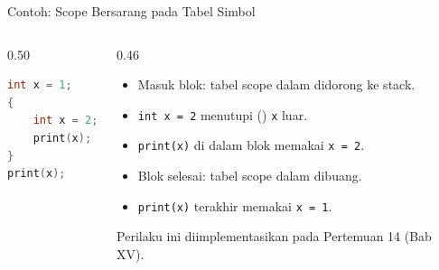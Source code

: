 \documentclass[aspectratio=169,10pt,t]{beamer}
\begin{document}
\begin{frame}[fragile]{Contoh: Scope Bersarang pada Tabel Simbol}
  \begin{columns}[T,onlytextwidth]
    \begin{column}{0.50\textwidth}
      \begin{lstlisting}[language=C,numbers=none,caption={Dua deklarasi \texttt{x} pada scope berbeda},label={lst:p1-shadow}]
int x = 1;
{
    int x = 2;
    print(x);
}
print(x);
      \end{lstlisting}
    \end{column}
    \begin{column}{0.46\textwidth}
      \footnotesize
      \begin{itemize}
        \setlength{\itemsep}{1pt}
        \item[1.] Masuk blok: tabel scope dalam didorong ke stack.
        \item[2.] \texttt{int x = 2} menutupi () \texttt{x} luar.
        \item[3.] \texttt{print(x)} di dalam blok memakai \texttt{x = 2}.
        \item[4.] Blok selesai: tabel scope dalam dibuang.
        \item[5.] \texttt{print(x)} terakhir memakai \texttt{x = 1}.
      \end{itemize}
      \vspace{2pt}
      {\scriptsize\color{ubbblue!75}Perilaku ini diimplementasikan pada
      Pertemuan 14 (Bab XV).}
    \end{column}
  \end{columns}
\end{frame}
\end{document}
